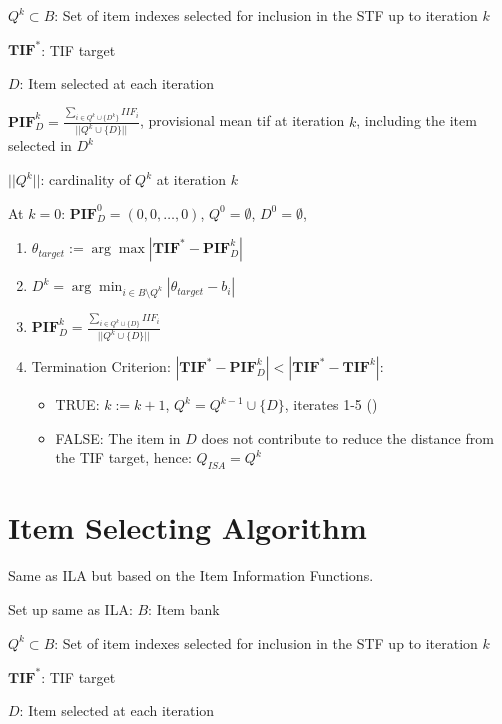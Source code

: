 \documentclass[12pt, a4paper, titilepage]{article}
\begin{document}
$Q^k \subset B$: Set of item indexes selected for inclusion in the STF up to iteration $k$

$\mathbf{TIF}^*$: TIF target 

$D$: Item selected at each iteration

$\mathbf{PIF}_D^k = \frac{\sum_{i\in Q^k \cup \{D^k\}} IIF_i}{||Q^k \cup \{D\}||}$, provisional mean tif at iteration $k$, including the item selected in $D^k$

$||Q^k||$: cardinality of $Q^k$ at iteration $k$

At $k = 0$: $\mathbf{PIF}_D^0 = (0, 0, \ldots, 0)$, $Q^0 = \emptyset$, $D^0 = \emptyset$,

\begin{enumerate}
	\item $\theta_{target} := \arg \max |\mathbf{TIF}^* - \mathbf{PIF}_D^{k}|$
	\item $D^k = \arg \min_{i \in B\setminus Q^k} |\theta_{target} - b_i|$
	\item $\mathbf{PIF}_D^k = \frac{\sum_{i \in Q^k \cup \{D\}} IIF_i}{||Q^k \cup \{D\}||}$
	\item Termination Criterion: $|\mathbf{TIF}^* - \mathbf{PIF}_D^k| < |\mathbf{TIF}^* - \mathbf{TIF}^{k}|$: 
	\begin{itemize}
		\item TRUE: $k := k +1$, $Q^{k} = Q^{k-1} \cup \{D\}$, iterates 1-5 ()
		\item FALSE: The item in $D$ does not contribute to reduce the distance from the TIF target, hence: $Q_{ISA} = Q^k$
	\end{itemize}
\end{enumerate}


\section{Item Selecting Algorithm}

Same as ILA but based on the Item Information Functions. 

\color{blue}

Set up same as ILA: 
$B$: Item bank 


$Q^k \subset B$: Set of item indexes selected for inclusion in the STF up to iteration $k$

$\mathbf{TIF}^*$: TIF target 

$D$: Item selected at each iteration 
\end{document}

